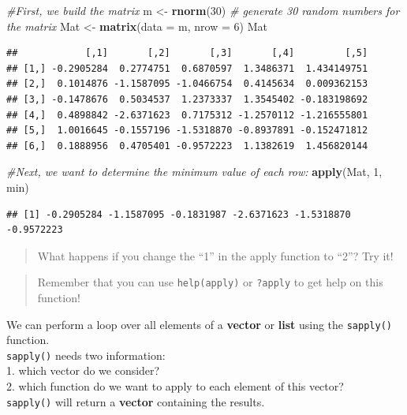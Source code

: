 \documentclass[
]{book}
\newenvironment{Shaded}{\begin{snugshade}}{\end{snugshade}}
\newcommand{\AttributeTok}[1]{\textcolor[rgb]{0.13,0.29,0.53}{#1}}
\newcommand{\CommentTok}[1]{\textcolor[rgb]{0.56,0.35,0.01}{\textit{#1}}}
\newcommand{\DecValTok}[1]{\textcolor[rgb]{0.00,0.00,0.81}{#1}}
\newcommand{\FunctionTok}[1]{\textcolor[rgb]{0.13,0.29,0.53}{\textbf{#1}}}
\newcommand{\NormalTok}[1]{#1}
\newcommand{\OtherTok}[1]{\textcolor[rgb]{0.56,0.35,0.01}{#1}}
\begin{document}
\begin{Shaded}
\begin{Highlighting}[]
\CommentTok{\#First, we build the matrix }
\NormalTok{m }\OtherTok{\textless{}{-}} \FunctionTok{rnorm}\NormalTok{(}\DecValTok{30}\NormalTok{)   }\CommentTok{\# generate 30 random numbers for the matrix}
\NormalTok{Mat }\OtherTok{\textless{}{-}} \FunctionTok{matrix}\NormalTok{(}\AttributeTok{data =}\NormalTok{ m, }\AttributeTok{nrow =} \DecValTok{6}\NormalTok{)}
\NormalTok{Mat}
\end{Highlighting}
\end{Shaded}

\begin{verbatim}
##            [,1]       [,2]       [,3]       [,4]         [,5]
## [1,] -0.2905284  0.2774751  0.6870597  1.3486371  1.434149751
## [2,]  0.1014876 -1.1587095 -1.0466754  0.4145634  0.009362153
## [3,] -0.1478676  0.5034537  1.2373337  1.3545402 -0.183198692
## [4,]  0.4898842 -2.6371623  0.7175312 -1.2570112 -1.216555801
## [5,]  1.0016645 -0.1557196 -1.5318870 -0.8937891 -0.152471812
## [6,]  0.1888956  0.4705401 -0.9572223  1.1382619  1.456820144
\end{verbatim}

\begin{Shaded}
\begin{Highlighting}[]
\CommentTok{\#Next, we want to determine the minimum value of each row: }
\FunctionTok{apply}\NormalTok{(Mat, }\DecValTok{1}\NormalTok{, min)}
\end{Highlighting}
\end{Shaded}

\begin{verbatim}
## [1] -0.2905284 -1.1587095 -0.1831987 -2.6371623 -1.5318870 -0.9572223
\end{verbatim}

\begin{quote}
What happens if you change the ``1'' in the apply function to ``2''?
Try it!
\end{quote}

\begin{quote}
Remember that you can use \texttt{help(apply)} or \texttt{?apply} to get help on this function!
\end{quote}

We can perform a loop over all elements of a \textbf{vector} or \textbf{list} using the \texttt{sapply()} function.\\
\texttt{sapply()} needs two information:\\
1.
which vector do we consider?\\
2.
which function do we want to apply to each element of this vector?\\
\texttt{sapply()} will return a \textbf{vector} containing the results.
\end{document}
